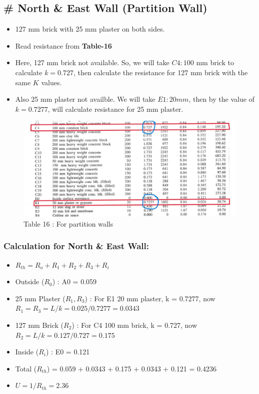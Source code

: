 \documentclass{article}
\begin{document}
\subsection*{\# North \& East Wall (Partition Wall)}
\begin{itemize}
  \item 127 mm brick with 25 mm plaster on both sides.
  \item Read resistance from \textbf{Table-16}
  \item Here, 127 mm brick not available. So, we will take $C4: 100 $ mm brick to calculate $k = 0.727$, then calculate the resistance for 127 mm brick with the same $K$ values. 
  \item Also 25 mm plaster not availble. We will take $E1 : 20 mm$, then by the value of $k=0.7277$, will calculate resistance for 25 mm plaster.
\end{itemize}
\begin{figure}[H]
  \begin{center}
    \includegraphics[width=\columnwidth]{img/partition.jpeg}
    \caption{Table 16 : For partition walls}
  \end{center}
\end{figure}

\subsubsection*{Calculation for North \& East Wall:}
\begin{itemize}
  \item $R_{th} = R_o + R_1 + R_2 + R_3 + R_i $
  \item Outside ($R_0$) : A0 = 0.059 
  \item 25 mm Plaster ($R_1, R_3$) : For E1 20 mm plaster, k = 0.7277, now $R_1 = R_3 = L/k = 0.025/0.7277 = 0.0343$ 
  \item 127 mm Brick ($R_2$) : For C4 100 mm brick, k = 0.727, now $R_2 = L/k = 0.127/0.727 = 0.175$
  \item Inside ($R_i$) : E0 = 0.121
  \item Total ($R_{th}$) = 0.059 + 0.0343 + 0.175 + 0.0343 + 0.121 = 0.4236
  \item $U = 1/R_{th} = 2.36$ 
\end{itemize}
\end{document}
